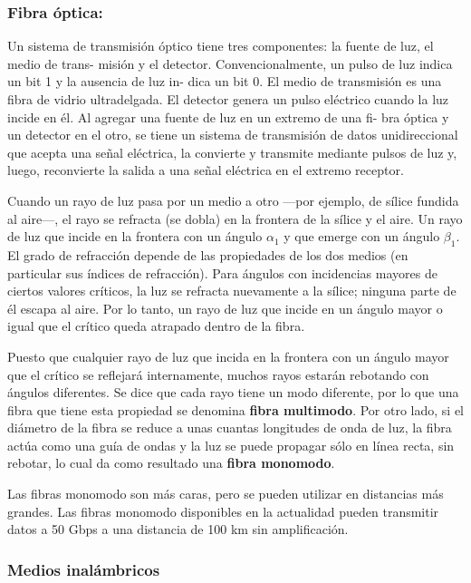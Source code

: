 \subsubsection*{Fibra óptica:}
Un sistema de transmisión óptico tiene tres componentes: la fuente de luz, el medio de trans-
misión y el detector. Convencionalmente, un pulso de luz indica un bit 1 y la ausencia de luz in-
dica un bit 0. El medio de transmisión es una fibra de vidrio ultradelgada. El detector genera un
pulso eléctrico cuando la luz incide en él. Al agregar una fuente de luz en un extremo de una fi-
bra óptica y un detector en el otro, se tiene un sistema de transmisión de datos unidireccional que
acepta una señal eléctrica, la convierte y transmite mediante pulsos de luz y, luego, reconvierte la
salida a una señal eléctrica en el extremo receptor.

Cuando un rayo de luz pasa por un medio a otro —por ejemplo, de sílice fundida al aire—, el rayo se refracta (se dobla) en la frontera de la sílice y el aire. Un rayo de luz que incide en la frontera con un ángulo \(\alpha_1\) y que emerge con un ángulo \(\beta_1\). El grado de refracción depende de las propiedades de los dos medios (en particular sus índices de refracción). Para ángulos con incidencias mayores de ciertos valores críticos, la luz se refracta nuevamente a la sílice; ninguna parte de él escapa al aire. Por lo tanto, un rayo de luz que incide en un ángulo mayor o igual que el crítico queda atrapado dentro de la fibra.

Puesto que cualquier rayo de luz que incida en la frontera con un ángulo mayor que el crítico se reflejará internamente, muchos rayos estarán rebotando con ángulos diferentes. Se dice que cada rayo tiene un
modo diferente, por lo que una fibra que tiene esta propiedad se denomina \textbf{fibra multimodo}. Por otro lado, si el diámetro de la fibra se reduce a unas cuantas longitudes de onda de luz, la fibra actúa como una guía de ondas y la luz se puede propagar sólo en línea recta, sin rebotar, lo cual da como resultado una \textbf{fibra monomodo}. 

Las fibras monomodo son más caras, pero se pueden utilizar en distancias más grandes. Las fibras monomodo disponibles en la actualidad pueden transmitir datos a 50 Gbps a una distancia de 100 km sin amplificación.

\subsubsection{Medios inalámbricos}
